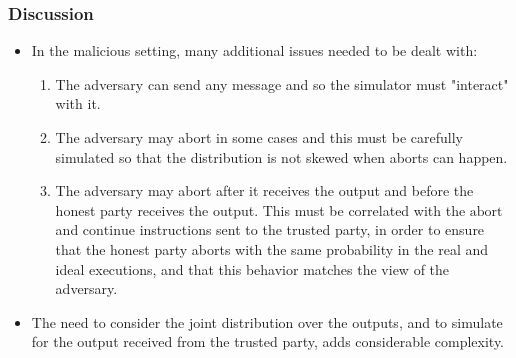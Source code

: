 \documentclass{beamer}
\begin{document}
    \begin{frame}
        \frametitle{Discussion}
    
        \begin{itemize}
            \item In the malicious setting, many additional issues needed to be dealt with:
            \begin{enumerate}
                \item The adversary can send any message and so the simulator must "interact" with it.
                \item The adversary may abort in some cases and this must be carefully simulated so that the distribution is not skewed when aborts can happen.
                \item The adversary may abort after it receives the output and before the honest party receives the output. This must be correlated with the $\mathrm{abort}$ and $\mathrm{continue}$ instructions sent to the trusted party, in order to ensure that the honest party aborts with the same probability in the real and ideal executions, and that this behavior matches the view of the adversary.
            \end{enumerate}
            \item The need to consider the joint distribution over the outputs, and to simulate for the output received from the trusted party, adds considerable complexity.
        \end{itemize}
    
    \end{frame}
\end{document}
